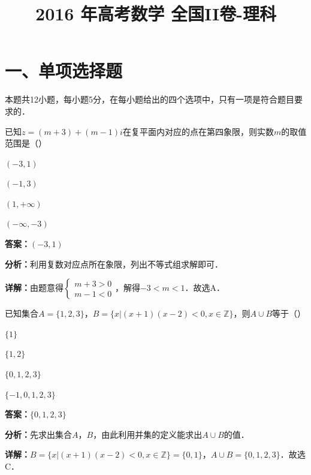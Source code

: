 ﻿\title{2016 年高考数学 全国II卷-理科}
\date{}
\maketitle

\section*{一、单项选择题}
本题共12小题，每小题5分，在每小题给出的四个选项中，只有一项是符合题目要求的．

\begin{question}[points=5]
已知$z=(m+3)+(m-1)i$在复平面内对应的点在第四象限，则实数$m$的取值范围是（\quad）
\begin{choices}
  \item $(-3,1)$
  \item $(-1,3)$
  \item $(1,+\infty)$
  \item $(-\infty,-3)$
\end{choices}
\begin{solution}
\textbf{答案：}$(-3,1)$

\textbf{分析：}利用复数对应点所在象限，列出不等式组求解即可．

\textbf{详解：}由题意得$\begin{cases} m+3>0 \\ m-1<0 \end{cases}$，解得$-3<m<1$．故选A．
\end{solution}
\end{question}

\begin{question}[points=5]
已知集合$A=\{1,2,3\}$，$B=\{x|(x+1)(x-2)<0,x\in\mathbb{Z}\}$，则$A\cup B$等于（\quad）
\begin{choices}
  \item $\{1\}$
  \item $\{1,2\}$
  \item $\{0,1,2,3\}$
  \item $\{-1,0,1,2,3\}$
\end{choices}
\begin{solution}
\textbf{答案：}$\{0,1,2,3\}$

\textbf{分析：}先求出集合$A$，$B$，由此利用并集的定义能求出$A\cup B$的值．

\textbf{详解：}$B=\{x|(x+1)(x-2)<0,x\in\mathbb{Z}\}=\{0,1\}$，$A\cup B=\{0,1,2,3\}$．故选C．
\end{solution}
\end{question}

